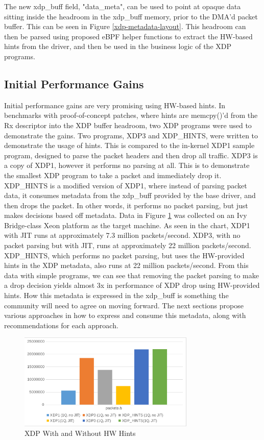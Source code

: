 \documentclass[letterpaper]{article}
\begin{document}
The new xdp\_buff field, "data\_meta", can be used to point at opaque data sitting inside the headroom in the xdp\_buff memory, prior to the DMA'd packet buffer. This can be seen in Figure \ref{xdp-metadata-layout}. This headroom can then be parsed using proposed eBPF helper functions to extract the HW-based hints from the driver, and then be used in the business logic of the XDP programs.

\subsection{Initial Performance Gains}

Initial performance gains are very promising using HW-based hints. In benchmarks with proof-of-concept patches, where hints are memcpy()'d from the Rx descriptor into the XDP buffer headroom, two XDP programs were used to demonstrate the gains.
\newline
\indent Two programs, XDP3 and XDP\_HINTS, were written to demonstrate the usage of hints. This is compared to the in-kernel XDP1 sample program, designed to parse the packet headers and then drop all traffic.  XDP3 is a copy of XDP1, however it performs no parsing at all. This is to demonstrate the smallest XDP program to take a packet and immediately drop it.  XDP\_HINTS is a modified version of XDP1, where instead of parsing packet data, it consumes metadata from the xdp\_buff provided by the base driver, and then drops the packet. In other words, it performs no packet parsing, but just makes decisions based off metadata.
\newline
\indent Data in Figure \ref {xdp-performance} was collected on an Ivy Bridge-class Xeon platform as the target machine. As seen in the chart, XDP1 with JIT runs at approximately 7.3 million packets/second. XDP3, with no packet parsing but with JIT, runs at approximately 22 million packets/second. XDP\_HINTS, which performs no packet parsing, but uses the HW-provided hints in the XDP metadata, also runs at 22 million packets/second. From this data with simple programs, we can see that removing the packet parsing to make a drop decision yields almost 3x in performance of XDP drop using HW-provided hints.
\newline
\indent How this metadata is expressed in the xdp\_buff is something the community will need to agree on moving forward. The next sections propose various approaches in how to express and consume this metadata, along with recommendations for each approach.
\begin{figure}[h]
\includegraphics[width=3.31in]{xdp-programs-performance.png}
\caption{XDP With and Without HW Hints}
\label{xdp-performance}
\end{figure}
\end{document}

